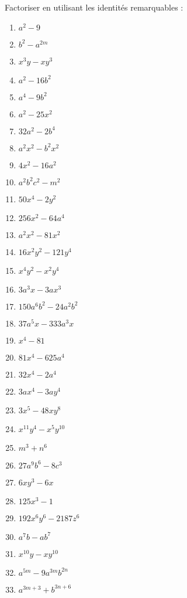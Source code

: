 \begin{exercice} Factoriser en utilisant les identités remarquables :
\begin{multicols}{2}
\begin{enumerate}
\item ${{a}^{2}}-9$
\item ${{b}^{2}}-{{a}^{2m}}$
\item ${{x}^{3}}y-x{{y}^{3}}$
\item ${{a}^{2}}-16{{b}^{2}}$
\item ${{a}^{4}}-9{{b}^{2}}$
\item ${{a}^{2}}-25{{x}^{2}}$
\item $32{{a}^{2}}-2{{b}^{4}}$
\item ${{a}^{2}}{{x}^{2}}-{{b}^{2}}{{x}^{2}}$
\item $4{{x}^{2}}-16{{a}^{2}}$
\item ${{a}^{2}}{{b}^{2}}{{c}^{2}}-{{m}^{2}}$
\item $50{{x}^{4}}-2{{y}^{2}}$
\item $256{{x}^{2}}-64{{a}^{4}}$
\item ${{a}^{2}}{{x}^{2}}-81{{x}^{2}}$
\item $16{{x}^{2}}{{y}^{2}}-121{{y}^{4}}$
\item ${{x}^{4}}{{y}^{2}}-{{x}^{2}}{{y}^{4}}$
\item $3{{a}^{3}}x-3a{{x}^{3}}$
\item $150{{a}^{6}}{{b}^{2}}-24{{a}^{2}}{{b}^{2}}$
\item $37{{a}^{5}}x-333{{a}^{3}}x$
\item ${{x}^{4}}-81$
\item $81{{x}^{4}}-625{{a}^{4}}$
\item $32{{x}^{4}}-2{{a}^{4}}$
\item $3a{{x}^{4}}-3a{{y}^{4}}$
\item $3{{x}^{5}}-48x{{y}^{8}}$
\item ${{x}^{11}}{{y}^{4}}-{{x}^{5}}{{y}^{10}}$
\item ${{m}^{3}}+{{n}^{6}}$
\item $27{{a}^{9}}{{b}^{6}}-8{{c}^{3}}$
\item $6x{{y}^{3}}-6x$
\item $125{{x}^{3}}-1$
\item $192{{x}^{6}}{{y}^{6}}-2187{{z}^{6}}$
\item ${{a}^{7}}b-a{{b}^{7}}$
\item ${{x}^{10}}y-x{{y}^{10}}$
\item ${{a}^{5m}}-9{{a}^{3m}}{{b}^{2n}}$
\item ${{a}^{3m+3}}+{{b}^{3n+6}}$

\end{enumerate}
\end{multicols}
\end{exercice}
